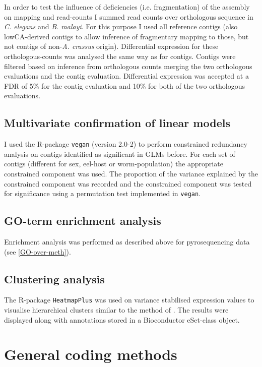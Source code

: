 In order to test the influence of deficiencies (i.e. fragmentation) of
the assembly on mapping and read-counts I summed read counts over
orthologous sequence in \textit{C. elegans} and
\textit{B. malayi}. For this purpose I used all reference contigs
(also lowCA-derived contigs to allow inference of fragmentary mapping
to those, but not contigs of non-\textit{A. crassus} origin).
Differential expression for these orthologous-counts was analysed the
same way as for contigs. Contigs were filtered based on inference
from orthologous counts merging the two orthologous evaluations and
the contig evaluation. Differential expression was accepted at a FDR
of 5\% for the contig evaluation and 10\% for both of the two
orthologous evaluations.

\subsection{Multivariate confirmation of linear models}
\label{sec:mult-conf-line}

I used the R-package \texttt{vegan} (version 2.0-2) to perform
constrained redundancy analysis on contigs identified as significant
in GLMs before. For each set of contigs (different for sex, eel-host
or worm-population) the appropriate constrained component was
used. The proportion of the variance explained by the constrained
component was recorded and the constrained component was tested for
significance using a permutation test implemented in \texttt{vegan}.

\subsection{GO-term enrichment analysis}

Enrichment analysis was performed as described above for
pyrosequencing data (see \ref{GO-over-meth}).

\subsection{Clustering analysis}

The R-package \texttt{HeatmapPlus} was used on variance stabilised
expression values to visualise hierarchical clusters similar to the
method of \cite{pmid9843981}. The results were displayed along with
annotations stored in a Bioconductor eSet-class object.

\section{General coding methods}

